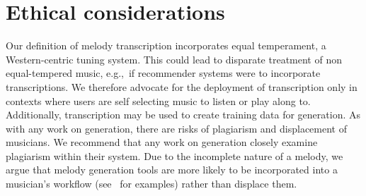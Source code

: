 \section{Ethical considerations}

Our definition of melody transcription incorporates equal temperament, a Western-centric tuning system. 
This could lead to disparate treatment of non equal-tempered music, e.g.,~if recommender systems were to incorporate transcriptions.
We therefore advocate for the deployment of transcription only in contexts where users are self selecting music to listen or play along to. 
Additionally, transcription may be used to create training data for generation. 
As with any work on generation, there are risks of plagiarism and displacement of musicians. 
We recommend that any work on generation closely examine plagiarism within their system. 
Due to the incomplete nature of a melody, we argue that melody generation tools are more likely to be incorporated into a musician's workflow (see~\cite{huang2020ai} for examples) rather than displace them.